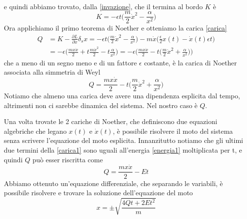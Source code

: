 \begin{example}
\begin{equation}
\begin{aligned}
\end{aligned}
\end{equation}
    e quindi abbiamo trovato, dalla \eqref{invazione}, che il termina al bordo $K$ è 
\begin{equation*}
    K = - \epsilon t \Big (\frac{m}{2} \dot x^2 - \frac{\alpha}{x^2} \Big)
\end{equation*}
    Ora applichiamo il primo teorema di Noether e otteniamo la carica \eqref{carica} 
\begin{equation}
\begin{aligned}
    Q & = K - \frac{\partial L}{\partial \dot x} \delta_s x = - \epsilon t \Big (\frac{m}{2} \dot x^2 - \frac{\alpha}{x^2} \Big) - m \dot x \Big (\frac{\epsilon}{2} x(t) - \dot x(t) \epsilon t \Big ) \\ & = - \epsilon \Big ( \frac{m x \dot x }{2} + t \frac{m \dot x^2}{2} - t \frac{\alpha}{x^2} \Big) = - \epsilon \Big ( \frac{m x \dot x}{2} - t \Big ( \frac{m}{2} \dot x^2 + \frac{\alpha}{x^2} \Big ) \Big )
\end{aligned}
\end{equation}
    che a meno di un segno meno e di un fattore $\epsilon$ costante, è la carica di Noether associata alla simmetria di Weyl
\begin{equation} \label{carica1}
    Q = \frac{m x \dot x}{2} - t \Big( \frac{m}{2} \dot x^2 + \frac{\alpha}{x^2} \Big)
\end{equation}
    Notiamo che almeno una carica deve avere una dipendenza esplicita dal tempo, altrimenti non ci sarebbe dinamica del sistema. Nel nostro caso è $Q$.
    
    Una volta trovate le 2 cariche di Noether, che definiscono due equazioni algebriche che legano $x(t)$ e $\dot x(t)$, è possibile risolvere il moto del sistema senza scrivere l'equazione del moto esplicita. Innanzitutto notiamo che gli ultimi due termini della \eqref{carica1} sono uguali all'energia \eqref{energia1} moltiplicata per t, e quindi $Q$ può esser riscritta come
\begin{equation*}
    Q = \frac{m x \dot x}{2} - Et
\end{equation*}
    Abbiamo ottenuto un'equazione differenziale, che separando le variabili, è possibile risolvere e trovare la soluzione dell'equazione del moto
\begin{equation} \label{soleqmoto}
    x = \pm \sqrt{\frac{4Qt + 2Et^2}{m}}
\end{equation}


\end{example}
